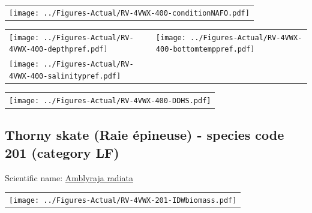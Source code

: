 \documentclass[12pt]{article}\usepackage[]{graphicx}\usepackage[]{color}
\begin{document}
\vspace{1cm}
\begin{minipage}{1.0\textwidth}
 \begin{tabular}{c}
\texttt{[image: ../Figures-Actual/RV-4VWX-400-conditionNAFO.pdf]} \\ 
\end{tabular} 
\end{minipage}
\clearpage
\begin{minipage}{1.0\textwidth}
 \begin{tabular}[t]{m{3in}m{3in}}
\texttt{[image: ../Figures-Actual/RV-4VWX-400-depthpref.pdf]} & 
\texttt{[image: ../Figures-Actual/RV-4VWX-400-bottomtemppref.pdf]} \\ 
\texttt{[image: ../Figures-Actual/RV-4VWX-400-salinitypref.pdf]} & 
 \\ 
\end{tabular} 
\end{minipage}
\newline

\vspace{1cm}
\begin{minipage}{1.0\textwidth}
 \begin{tabular}{c}
\texttt{[image: ../Figures-Actual/RV-4VWX-400-DDHS.pdf]} \\ 
\end{tabular} 
\end{minipage}
\clearpage

\renewcommand\thefigure{\thesubsection\Alph{figure}}

\setcounter{figure}{0}

\hypertarget{sec:201}{%
\subsection{Thorny skate (Raie épineuse) - species code 201 (category LF)}\label{sec:201}}

  


Scientific name: \href{http://www.marinespecies.org/aphia.php?p=taxdetails\&id=105865}{Amblyraja radiata} \newline
\begin{minipage}{1.0\textwidth}
 \begin{tabular}{c}
\texttt{[image: ../Figures-Actual/RV-4VWX-201-IDWbiomass.pdf]} \\ 
\end{tabular} 
\end{minipage}
\newline
\end{document}

